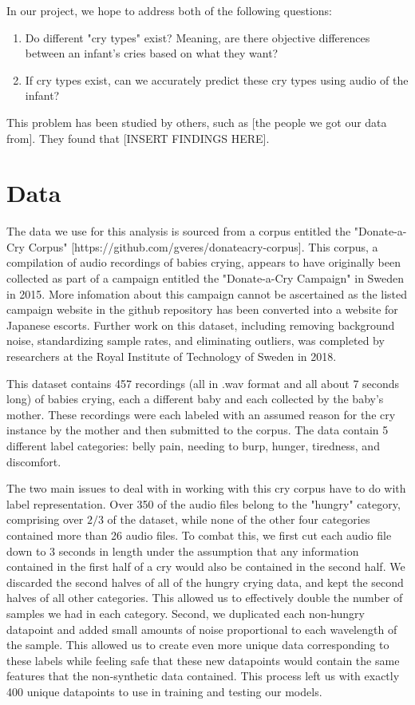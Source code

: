 \documentclass[11pt]{article}
\begin{document}
In our project, we hope to address both of the following questions:
\begin{enumerate}
   \item Do different "cry types" exist? Meaning, are there objective differences between an infant's cries based on what they want?
   \item If cry types exist, can we accurately predict these cry types using audio of the infant?
\end{enumerate}

This problem has been studied by others, such as [the people we got our data from].
They found that [INSERT FINDINGS HERE].


\section{Data}
The data we use for this analysis is sourced from a corpus entitled
the "Donate-a-Cry Corpus" [https://github.com/gveres/donateacry-corpus].
This corpus, a compilation of audio recordings of babies crying, appears to have originally been collected as part of a campaign entitled the "Donate-a-Cry Campaign" in Sweden in 2015.
More infomation about this campaign cannot be ascertained as the listed campaign website in the github repository has been converted into a website for Japanese escorts.
Further work on this dataset, including removing background noise, standardizing sample rates, and eliminating outliers, was completed by researchers at the Royal Institute of Technology of Sweden in 2018.

This dataset contains 457 recordings (all in .wav format and all about 7 seconds long) of babies crying, each a different baby and each collected by the baby's mother.
These recordings were each labeled with an assumed reason for the cry instance by the mother and then submitted to the corpus.
The data contain 5 different label categories: belly pain, needing to burp, hunger, tiredness, and discomfort.

The two main issues to deal with in working with this cry corpus have to do with label representation.
Over 350 of the audio files belong to the "hungry" category, comprising over $2/3$ of the dataset, while none of the other four categories contained more than 26 audio files.
To combat this, we first cut each audio file down to 3 seconds in length under the assumption that any information contained in the first half of a cry would also be contained in the second half.
We discarded the second halves of all of the hungry crying data, and kept the second halves of all other categories.
This allowed us to effectively double the number of samples we had in each category.
Second, we duplicated each non-hungry datapoint and added small amounts of noise proportional to each wavelength of the sample.
This allowed us to create even more unique data corresponding to these labels while feeling safe that these new datapoints would contain the same features that the non-synthetic data contained.
This process left us with exactly 400 unique datapoints to use in training and testing our models.
\end{document}
